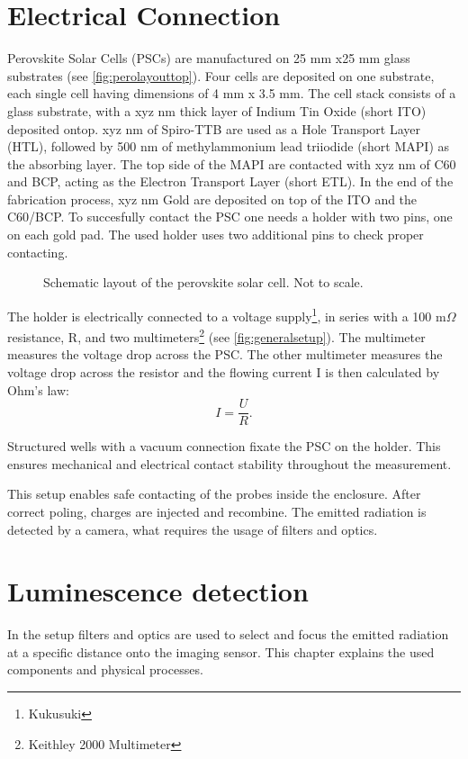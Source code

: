 \section{Electrical Connection}\label{sec:electricalconnection}
Perovskite Solar Cells (PSCs) are manufactured on 25 mm x25 mm glass substrates (see \autoref{fig:perolayouttop}). Four cells are deposited on one substrate, each single cell having dimensions of 4 mm x 3.5 mm. The cell stack consists of a glass substrate, with a xyz nm thick layer of Indium Tin Oxide (short ITO) deposited ontop. xyz nm of Spiro-TTB are used as a Hole Transport Layer (HTL), followed by 500 nm of methylammonium lead triiodide (short MAPI) as the absorbing layer. The top side of the MAPI are contacted with xyz nm of C60 and BCP, acting as the Electron Transport Layer (short ETL). In the end of the fabrication process, xyz nm Gold are deposited on top of the ITO and the C60/BCP. To succesfully contact the PSC one needs a holder with two pins, one on each gold pad. The used holder uses two additional pins to check proper contacting.
\begin{figure}
	\centering
	
	\caption{Schematic layout of the perovskite solar cell. Not to scale.}
	\label{fig:perolayouttop}
\end{figure}

The holder is electrically connected to a voltage supply\footnote{Kukusuki}, in series with a 100 m$\Omega$ resistance, R, and two multimeters\footnote{Keithley 2000 Multimeter} (see \autoref{fig:generalsetup}). The multimeter measures the voltage drop across the PSC. The other multimeter measures the voltage drop across the resistor and the flowing current I is then calculated by Ohm's law:
\begin{equation}
	I = \frac{U}{R}.
\end{equation}

Structured wells with a vacuum connection fixate the PSC on the holder. This ensures mechanical and electrical contact stability throughout the measurement.

This setup enables safe contacting of the probes inside the enclosure. After correct poling, charges are injected and recombine. The emitted radiation is detected by a camera, what requires the usage of filters and optics.

\section{Luminescence detection}\label{sec:luminescencedetection}
In the setup filters and optics are used to select and focus the emitted radiation at a specific distance onto the imaging sensor. This chapter explains the used components and physical processes.
